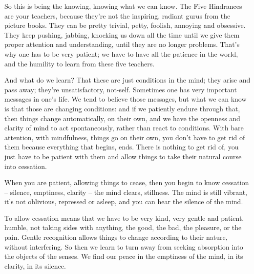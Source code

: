 So this is being the knowing, knowing what we can know. The Five Hindrances are your teachers, because they're not the inspiring, radiant gurus from the picture books. They can be pretty trivial, petty, foolish, annoying and obsessive. They keep pushing, jabbing, knocking us down all the time until we give them proper attention and understanding, until they are no longer problems. That's why one has to be very patient; we have to have all the patience in the world, and the humility to learn from these five teachers.

And what do we learn? That these are just conditions in the mind; they arise and pass away; they're unsatisfactory, not-self. Sometimes one has very important messages in one's life. We tend to believe those messages, but what we can know is that those are changing conditions: and if we patiently endure through that, then things change automatically, on their own, and we have the openness and clarity of mind to act spontaneously, rather than react to conditions. With bare attention, with mindfulness, things go on their own, you don't have to get rid of them because everything that begins, ends. There is nothing to get rid of, you just have to be patient with them and allow things to take their natural course into cessation.

When you are patient, allowing things to cease, then you begin to know cessation -- silence, emptiness, clarity -- the mind clears, stillness. The mind is still vibrant, it's not oblivious, repressed or asleep, and you can hear the silence of the mind.

To allow cessation means that we have to be very kind, very gentle and patient, humble, not taking sides with anything, the good, the bad, the pleasure, or the pain. Gentle recognition allows things to change according to their nature, without interfering. So then we learn to turn away from seeking absorption into the objects of the senses. We find our peace in the emptiness of the mind, in its clarity, in its silence.



